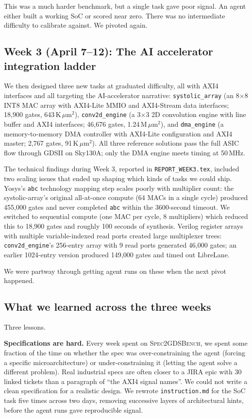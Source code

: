 \documentclass{article}
\begin{document}
This was a much harder benchmark, but a single task gave poor signal. An agent either
built a working SoC or scored near zero. There was no intermediate difficulty to
calibrate against. We pivoted again.

\subsection{Week 3 (April 7--12): The AI accelerator integration ladder}

We then designed three new tasks at graduated difficulty, all with AXI4 interfaces and
all targeting the AI-accelerator narrative: \texttt{systolic\_array} (an 8$\times$8 INT8
MAC array with AXI4-Lite MMIO and AXI4-Stream data interfaces; 18{,}900 gates,
643\,K\,$\mu$m$^2$), \texttt{conv2d\_engine} (a 3$\times$3 2D convolution engine with line
buffer and AXI4 interfaces; 46{,}676 gates, 1.24\,M\,$\mu$m$^2$), and
\texttt{dma\_engine} (a memory-to-memory DMA controller with AXI4-Lite configuration and
AXI4 master; 2{,}767 gates, 91\,K\,$\mu$m$^2$). All three reference solutions pass the
full ASIC flow through GDSII on Sky130A; only the DMA engine meets timing at 50\,MHz.

The technical findings during Week 3, reported in \texttt{REPORT\_WEEK3.tex}, included
two scaling issues that ended up shaping which kinds of tasks we could ship. Yosys's
\texttt{abc} technology mapping step scales poorly with multiplier count: the
systolic-array's original all-at-once compute (64 MACs in a single cycle) produced
455{,}000 gates and never completed \texttt{abc} within the 3600-second timeout. We
switched to sequential compute (one MAC per cycle, 8 multipliers) which reduced this to
18{,}900 gates and roughly 100 seconds of synthesis. Verilog register arrays with multiple
variable-indexed read ports created large multiplexer trees: \texttt{conv2d\_engine}'s
256-entry array with 9 read ports generated 46{,}000 gates; an earlier 1024-entry version
produced 149{,}000 gates and timed out LibreLane.

We were partway through getting agent runs on these when the next pivot happened.

\subsection{What we learned across the three weeks}

Three lessons.

\textbf{Specifications are hard.} Every week spent on \textsc{Spec2GDSBench}, we spent some
fraction of the time on whether the spec was over-constraining the agent (forcing a
specific microarchitecture) or under-constraining it (letting the agent solve a different
problem). Real industrial specs are often closer to a JIRA epic with 30 linked tickets
than a paragraph of ``the AXI4 signal names''. We could not write a clean specification
for a realistic design. We rewrote \texttt{instruction.md} for the SoC task five times
across two days, removing successive layers of architectural hints, before the agent
runs gave reproducible signal.
\end{document}
